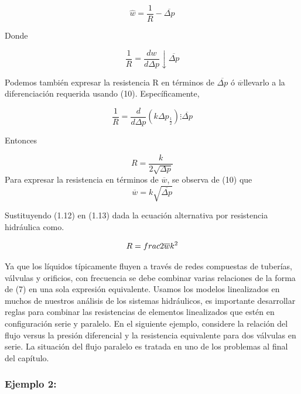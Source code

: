 \documentclass[a4paper,12pt,twoside]{proyectotanquesecci}
\begin{document}
\begin{equation}
\widehat{w}=\frac{1}{R}-\overline{\Delta p}
\end{equation}

Donde

\begin{equation}
\frac{1}{R}=\frac{dw}{d\Delta p}\downarrow\overline{\Delta p}
\end{equation}

Podemos también expresar la resistencia R en términos de $\overline{\Delta p}$ ó $\overline{w}$llevarlo a la diferenciación requerida usando (10). Específicamente,

\begin{equation}
\frac{1}{R}=\frac{d}{d\Delta p}(k\Delta p_{\frac{1}{2}})\vdots \overline{\Delta p}
\end{equation}

Entonces

\begin{equation}
R=\frac{k}{2\sqrt{\Delta p}}
\end{equation} 
Para expresar la resistencia en términos de $\overline{w}$, se observa de (10) que 
\begin{equation}
\overline{w}=k\sqrt{\overline{\Delta p}}
\end{equation}

Sustituyendo (1.12) en (1.13) dada la ecuación alternativa por resistencia hidráulica como.

\begin{equation}
R=\\frac{2\overline{w}}{k^{2}}
\end{equation}

Ya que los líquidos típicamente fluyen a través de redes compuestas de tuberías, válvulas y orificios, con frecuencia se debe combinar varias relaciones de la forma de (7) en una sola expresión equivalente. Usamos los modelos linealizados en muchos de nuestros análisis de los sistemas hidráulicos, es importante desarrollar reglas para combinar las resistencias de elementos linealizados que estén en configuración serie y paralelo. En el siguiente ejemplo, considere la relación del flujo versus la presión diferencial y la resistencia equivalente para dos válvulas en serie. La situación del flujo paralelo es tratada en uno de los problemas al final del capítulo. \\

\subsubsection{Ejemplo 2:}
\end{document}
